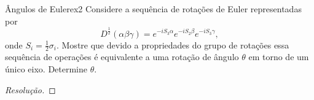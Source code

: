 \begin{exercício}{Ângulos de Euler}{ex2}
    Considere a sequência de rotações de Euler representadas por
    \begin{equation*}
        D^{\frac12}(\alpha \beta \gamma) = e^{-iS_3 \alpha} e^{-i S_2 \beta} e^{-i S_3 \gamma},
    \end{equation*}
    onde \(S_{i} = \frac12 \sigma_i.\) Mostre que devido a propriedades do grupo de rotações essa sequência de operações é equivalente a uma rotação de ângulo \(\theta\) em torno de um único eixo. Determine \(\theta\).
\end{exercício}
\begin{proof}[Resolução]
    
\end{proof}
